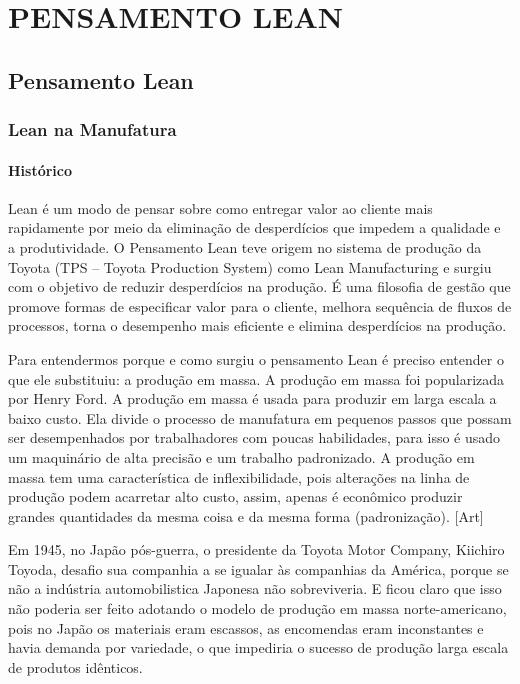 \part{PENSAMENTO LEAN}

\chapter[Pensamento Lean]{Pensamento Lean}



\section[Lean na Manufatura]{Lean na Manufatura}

\subsection[Histórico]{Histórico}

Lean é um modo de pensar sobre como entregar valor ao cliente mais rapidamente por meio da eliminação de desperdícios que impedem a qualidade e a produtividade. O Pensamento Lean teve origem no sistema de produção da Toyota (TPS – Toyota Production System) como Lean Manufacturing e surgiu com o objetivo de reduzir desperdícios na produção. É uma filosofia de gestão que promove formas de especificar valor para o cliente, melhora sequência de fluxos de processos, torna o desempenho mais eficiente e elimina desperdícios na produção. 

Para entendermos porque e como surgiu o pensamento Lean é preciso entender o que ele substituiu: a produção em massa.  A produção em massa foi popularizada por Henry Ford. A produção em massa é usada para produzir em larga escala a baixo custo. Ela divide o processo de manufatura em pequenos passos que possam ser desempenhados por trabalhadores com poucas habilidades, para isso é usado um maquinário de alta precisão e um trabalho padronizado. A produção em massa tem uma característica de inflexibilidade, pois alterações na linha de produção podem acarretar alto custo, assim, apenas é econômico produzir grandes quantidades da mesma coisa e da mesma forma (padronização). [Art]

Em 1945, no Japão pós-guerra, o presidente da Toyota Motor Company, Kiichiro Toyoda, desafio sua companhia a se igualar às companhias da América, porque se não a indústria automobilistica Japonesa não sobreviveria. E ficou claro que isso não poderia ser feito adotando o modelo de produção em massa norte-americano, pois no Japão os materiais eram escassos, as encomendas eram inconstantes e havia demanda por variedade, o que impediria o sucesso de produção larga escala de produtos idênticos. 

